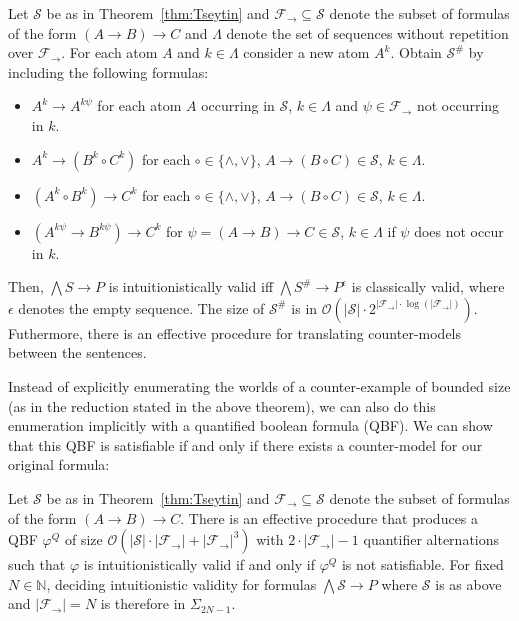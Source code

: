 \documentclass[runningheads]{llncs}
\begin{document}
\begin{theorem}
\label{thm:reduction-propositional}
	Let $\mathcal S$ be as in Theorem~\ref{thm:Tseytin} and $\mathcal F_\to\subseteq\mathcal S$ denote the subset of formulas of the form $(A\to B)\to C$ and $\Lambda$ denote the set of sequences without repetition over $\mathcal F_\to$. For each atom $A$ and $k\in\Lambda$ consider a new atom $A^k$. Obtain $\mathcal S^\#$ by including the following formulas:
	\begin{itemize}
		\item $A^k\to A^{k\psi}$ for each atom $A$ occurring in $\mathcal S$, $k\in\Lambda$ and $\psi\in\mathcal F_\to$ not occurring in $k$.
		\item $A^k\to (B^k\circ C^k)$ for each $\circ\in\{\wedge,\vee\}$, $A\to (B\circ C)\in\mathcal S$, $k\in\Lambda$.
		\item $(A^k\circ B^k)\to C^k$ for each $\circ\in\{\wedge,\vee\}$, $A\to (B\circ C)\in\mathcal S$, $k\in\Lambda$.
		\item $(A^{k\psi}\to B^{k\psi})\to C^k$ for $\psi = (A\to B)\to C\in\mathcal S$, $k\in\Lambda$ if $\psi$ does not occur in $k$.
	\end{itemize}
Then, $\bigwedge S\to P$ is intuitionistically valid iff $\bigwedge S^\#\to P^\epsilon$ is classically valid, where $\epsilon$ denotes the empty sequence. The size of $\mathcal S^\#$ is in $\mathcal O(|\mathcal S|\cdot2^{|\mathcal F_\to|\cdot\log(|\mathcal F_\to|)})$. Futhermore, there is an effective procedure for translating counter-models between the sentences.
\end{theorem}

Instead of explicitly enumerating the worlds of a counter-example of bounded size (as in the reduction stated in the above theorem), we can also do this enumeration implicitly with a quantified boolean formula (QBF).
We can show that this QBF is satisfiable if and only if there exists a counter-model for our original formula:

\begin{theorem}
	Let $\mathcal S$ be as in Theorem~\ref{thm:Tseytin} and $\mathcal F_\to\subseteq\mathcal S$ denote the subset of formulas of the form $(A\to B)\to C$. There is an effective procedure that produces a QBF $\varphi^Q$ of size $\mathcal O(|\mathcal S|\cdot|\mathcal F_\to| + |\mathcal F_\to|^3)$ with $2\cdot |\mathcal F_\to|-1$ quantifier alternations such that $\varphi$ is intuitionistically valid if and only if $\varphi^Q$ is not satisfiable. For fixed $N\in\mathbb N$, deciding intuitionistic validity for formulas $\bigwedge \mathcal S\to P$ where $\mathcal S$ is as above and $|\mathcal F_\to| = N$ is therefore in $\Sigma_{2N-1}$.
\end{theorem}
\end{document}
